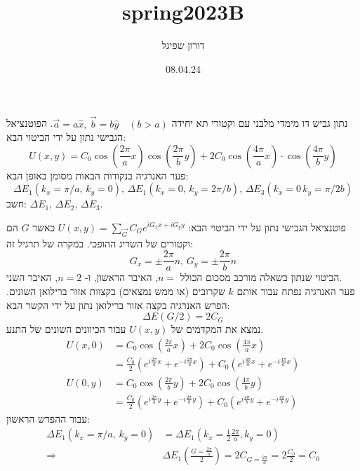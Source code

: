 \documentclass{article}
\title{spring2023B}
\author{דורון שפיגל}
\date{08.04.24}
\begin{document}
\maketitle
\begin{Question}
נתון גביש דו מימדי מלבני עם וקטורי תא יחידה $\vec{a}=a\hat{x},\,\vec{b}=b\hat{y}\quad (b>a)$. הפוטנציאל הגבישי נתון על ידי הביטוי הבא:
$$U\left( x,y \right)=C_{0}\cos\left( \frac{2\pi}{a}x \right)\cos\left( \frac{2\pi}{b}y \right)+2C_{0}\cos\left( \frac{4\pi}{a}x \right)\cdot \cos\left( \frac{4\pi}{b}y \right)
$$
פער האנרגיה בנקודות הבאות מסומן באופן הבא:
$$\Delta E_{1}\left( k_{x}=\pi/a,\, k_{y}=0 \right),\, \Delta E_{1}\left( k_{x}=0,\, k_{y}=2\pi/b \right),\, \Delta E_{3}\left( k_{x}=0\, k_{y}=\pi/2b \right)$$
חשב: $\Delta E_{1},\, \Delta E_{2},\, \Delta E_{3}$.
\end{Question}
\begin{Answer}
פוטנציאל הגבישי נתון על ידי הביטוי הבא: $U\left( x,y \right)=\sum \limits^{}_{\vec{G}}{C_{G}e^{iG_{x}x+iG_{y}y}}$ כאשר $G$ הם וקטורים של השריג ההופכי. במקרה של תרגיל זה:
$$
G_{x}=\pm\frac{2\pi}{a}n,\, G_{y}=\pm\frac{2\pi}{b}n
$$ הביטוי שנתון בשאלה מורכב מסכום הכולל $n=$, האיבר הראשון, ו- $n=2$, האיבר השני.\\
פער האנרגיה נפתח עבור אותם $k$ שקרובים (או ממש נמצאים) בקצוות אזור ברילואן השונים. הפרש האנרגיה בקצה אזור ברילואן נתון על ידי הקשר הבא:
$$\Delta E\left( G/ 2 \right) = 2C_{G}$$
נמצא את המקדמים של $U(x,y)$ עבור הכיוונים השונים של התנע.
\begin{align*}
    U\left( x,0 \right)&=C_{0}\cos\left( \frac{2\pi}{a}x \right)+2C_{0}\cos\left( \frac{4\pi}{a}x \right)\\
    &=\frac{C_{0}}{2}\left( e^{i\frac{2\pi}{a}x}+e^{-i\frac{2\pi}{a}x} \right)+C_{0}\left( e^{i\frac{4\pi}{a}x}+e^{-i\frac{4\pi}{a}x} \right)\\
    U\left( 0,y \right)&=C_{0}\cos\left( \frac{2\pi}{b}y \right)+2C_{0}\cos\left( \frac{4\pi}{b}y \right)\\
    &=\frac{C_{0}}{2}\left( e^{i\frac{2\pi}{b}y}+e^{-i\frac{2\pi}{b}y} \right)+C_{0}\left( e^{i\frac{4\pi}{b}y}+e^{-i\frac{4\pi}{b}y} \right)
\end{align*}
עבור ההפרש הראשון:
\begin{align*}
    \Delta E_{1}\left( k_{x}=\pi/a,\, k_{y}=0 \right)&=\Delta E_{1}\left( k_{x}=\frac{1}{2}\frac{2\pi}{a},k_{y}=0\right)\\
    \Rightarrow &\Delta E_{1}\left( \frac{G=\frac{2\pi}{a}}{2} \right)=2C_{G=\frac{2\pi}{a}}=2\frac{C_{0}}{2}=C_{0}
\end{align*}

\end{Answer}
\end{document}
